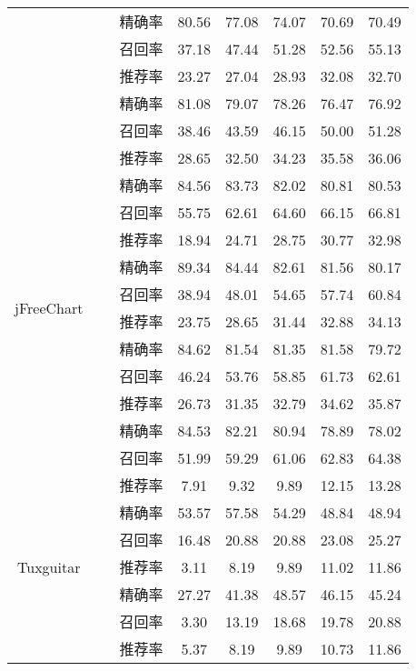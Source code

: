 \begin{table}
\begin{tabular}{cccccccc}
&  &精确率 & 80.56 & 77.08 & 74.07 & 70.69 & 70.49 \\
&  &召回率 & 37.18 & 47.44 & 51.28 & 52.56 & 55.13 \\
\cline{2-8}
&~\multirow{3}{*}{无演化属性(\%)}    
& 推荐率 & 23.27 & 27.04 & 28.93 & 32.08 & 32.70 \\
&  &精确率 & 81.08 & 79.07 & 78.26 & 76.47 & 76.92 \\
&  &召回率 & 38.46 & 43.59 & 46.15 & 50.00 & 51.28 \\
\hline
\multirow{12}{*}{jFreeChart}
&~\multirow{3}{*}{全部属性(\%) }
& 推荐率 & 28.65 & 32.50 & 34.23 & 35.58 & 36.06 \\
&  &精确率 & 84.56 & 83.73 & 82.02 & 80.81 & 80.53 \\
&  &召回率 & 55.75 & 62.61 & 64.60 & 66.15 & 66.81 \\
\cline{2-8}
&~\multirow{3}{*}{无代码属性(\%)}    
 & 推荐率 & 18.94 & 24.71 & 28.75 & 30.77 & 32.98 \\
&  &精确率 & 89.34 & 84.44 & 82.61 & 81.56 & 80.17 \\
&  &召回率 & 38.94 & 48.01 & 54.65 & 57.74 & 60.84 \\
\cline{2-8}
&~\multirow{3}{*}{无上下文属性(\%)}    
& 推荐率 & 23.75 & 28.65 & 31.44 & 32.88 & 34.13 \\
&  &精确率 & 84.62 & 81.54 & 81.35 & 81.58 & 79.72 \\
&  &召回率 & 46.24 & 53.76 & 58.85 & 61.73 & 62.61 \\
\cline{2-8}
&~\multirow{3}{*}{无演化属性(\%)}    
& 推荐率 & 26.73 & 31.35 & 32.79 & 34.62 & 35.87 \\
&  &精确率 & 84.53 & 82.21 & 80.94 & 78.89 & 78.02 \\
&  &召回率 & 51.99 & 59.29 & 61.06 & 62.83 & 64.38 \\
\hline
\multirow{12}{*}{Tuxguitar}
&~\multirow{3}{*}{全部属性(\%) }
& 推荐率 & 7.91  & 9.32  & 9.89  & 12.15 & 13.28 \\
&  &精确率 & 53.57 & 57.58 & 54.29 & 48.84 & 48.94 \\
&  &召回率 & 16.48 & 20.88 & 20.88 & 23.08 & 25.27 \\
\cline{2-8}
&~\multirow{3}{*}{无代码属性(\%)}    
& 推荐率 & 3.11  & 8.19  & 9.89  & 11.02 & 11.86 \\
&  &精确率 & 27.27 & 41.38 & 48.57 & 46.15 & 45.24 \\
&  &召回率 & 3.30  & 13.19 & 18.68 & 19.78 & 20.88 \\
\cline{2-8}
&~\multirow{3}{*}{无上下文属性 (\%)}    
 & 推荐率 & 5.37  & 8.19  & 9.89  & 10.73 & 11.86 \\

\end{tabular}
\end{table}
